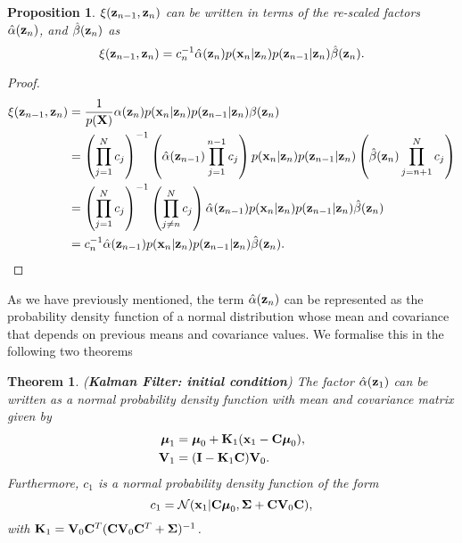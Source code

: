 \documentclass[11pt]{article}
\numberwithin{equation}{section}
\newcommand{\x}{{\bf x}}
\newcommand{\z}{{\bf z}}
\newcommand{\N}{\mathcal{N}}
\newtheorem{proposition}{Proposition}[section]
\newtheorem{theorem}{Theorem}[section]
\begin{document}
\begin{proposition} \label{prop:xi-rewrite}
	$\xi(\z_{n-1}, \z_n)$ can be written in terms of the re-scaled factors $\hat\alpha(\z_n)$, and $\hat\beta(\z_n)$ as
	\begin{equation}
		\xi(\z_{n-1}, \z_{n}) = c_n^{-1}\hat\alpha(\z_n)p(\x_n \vert \z_n) p(\z_{n-1}\vert \z_n)\hat\beta(\z_n).
	\end{equation}
\end{proposition}

\begin{proof}
	\begin{align}
		\xi(\z_{n-1}, \z_n) &= \frac{1}{p({\bf X})} \alpha(\z_n) p(\x_n \vert \z_n) p(\z_{n-1} \vert \z_n) \beta(\z_n) \\
		&= \left(\prod_{j=1}^N c_j\right)^{-1} \left(\hat\alpha(\z_{n-1}) \prod_{j=1}^{n-1} c_j\right)p(\x_n \vert \z_n) p(\z_{n-1} \vert \z_n)\left(\hat\beta(\z_n) \prod_{j={n+1}}^N c_j\right) \\
		&= \left(\prod_{j=1}^N c_j\right)^{-1} \left(\prod_{j\neq n}^N c_j\right) \hat\alpha(\z_{n-1}) p(\x_n \vert \z_n) p(\z_{n-1} \vert \z_n) \hat\beta(\z_n)\\
		&= c_n^{-1}\hat\alpha(\z_{n-1}) p(\x_n \vert \z_n) p(\z_{n-1} \vert \z_n) \hat\beta(\z_n).
	\end{align}
\end{proof}


As we have previously mentioned, the term $\hat\alpha(\z_n)$ can be represented as the probability density function of a normal distribution whose mean and covariance that depends on previous means and covariance values. We formalise this in the following two theorems

\begin{theorem} (\textbf{Kalman Filter: initial condition}) \label{theorem:alpha-forward-equations-1}
	The factor $\hat\alpha(\z_1)$ can be written as a normal probability density function with mean and covariance matrix given by
	\begin{align}
		\boldsymbol{\mu}_1 &= \boldsymbol{\mu}_0 + {\bf K}_1(\x_1 -{\bf C}\boldsymbol\mu_0),\\
		{\bf V}_1 &=  ({\bf I} - {\bf K}_1{\bf C}){\bf V}_0.
	\end{align}
	Furthermore, $c_1$ is a normal probability density function of the form
	\begin{equation}
		c_1 = \N(\x_1\vert {\bf C}\boldsymbol\mu_0, \boldsymbol\Sigma + {\bf C} {\bf V}_0 {\bf C}),
	\end{equation}
	with ${\bf K}_1 = {\bf V}_0{\bf C}^T({\bf C} {\bf V}_0 {\bf C}^T + \boldsymbol\Sigma)^{-1}$.
\end{theorem}
\end{document}
